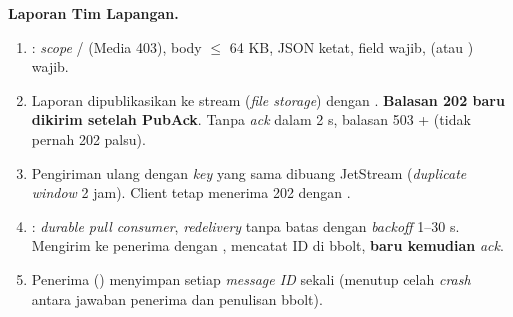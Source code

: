 \textbf{Laporan Tim Lapangan.}
\begin{enumerate}
\item {}: \textit{scope} / (Media 403), body $\le$ 64 KB, JSON ketat, field wajib,  (atau ) wajib.
\item Laporan dipublikasikan ke stream  (\textit{file storage}) dengan . \textbf{Balasan 202 baru dikirim setelah PubAck}. Tanpa \textit{ack} dalam 2 s, balasan 503 +  (tidak pernah 202 palsu).
\item Pengiriman ulang dengan \textit{key} yang sama dibuang JetStream (\textit{duplicate window} 2 jam). Client tetap menerima 202 dengan .
\item {}: \textit{durable pull consumer}, \textit{redelivery} tanpa batas dengan \textit{backoff} 1--30 s. Mengirim ke penerima dengan , mencatat ID di bbolt, \textbf{baru kemudian} \textit{ack}.
\item Penerima () menyimpan setiap \textit{message ID} sekali (menutup celah \textit{crash} antara jawaban penerima dan penulisan bbolt).
\end{enumerate}

